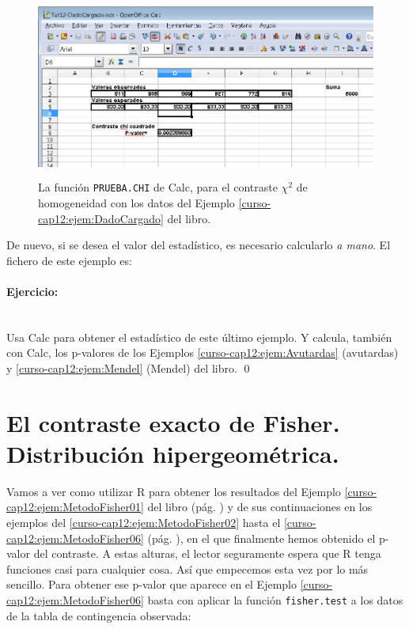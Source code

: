\documentclass[10pt,a4paper]{article}\usepackage[]{graphicx}\usepackage[]{color}
\newcounter {cont01}
\begin{document}
\begin{figure}[tb]
\begin{center}
    \includegraphics[height=6cm]{../fig/Tut12-Calc02.png}
\end{center}
\caption{La función {\tt PRUEBA.CHI} de Calc, para el contraste $\chi^2$ de homogeneidad con los datos del Ejemplo \ref{curso-cap12:ejem:DadoCargado} del libro.}
\label{tut10:fig:Calc02}
\end{figure}
De nuevo, si se desea el valor del estadístico, es necesario calcularlo {\em a mano}. El fichero de este ejemplo es:
\begin{center}
\end{center}

\paragraph{Ejercicio:}\label{tut12:ejercicio07}\quad\\
Usa Calc para obtener el estadístico de este último ejemplo. Y calcula, también con Calc, los p-valores de los Ejemplos \ref{curso-cap12:ejem:Avutardas} (avutardas) y \ref{curso-cap12:ejem:Mendel} (Mendel) del libro.
\qed



\section{El contraste exacto de Fisher. Distribución hipergeométrica.}

Vamos a ver como utilizar R para obtener los resultados del Ejemplo \ref{curso-cap12:ejem:MetodoFisher01} del libro (pág. \pageref{curso-cap12:ejem:MetodoFisher01}) y de sus continuaciones en los ejemplos del \ref{curso-cap12:ejem:MetodoFisher02} hasta el  \ref{curso-cap12:ejem:MetodoFisher06} (pág. \pageref{curso-cap12:ejem:MetodoFisher06}), en el que finalmente hemos obtenido el p-valor del contraste. A estas alturas, el lector seguramente espera que R tenga funciones casi para cualquier cosa. Así que empecemos esta vez por lo más sencillo. Para obtener ese p-valor que aparece en el Ejemplo \ref{curso-cap12:ejem:MetodoFisher06} basta con aplicar la función {\tt fisher.test} a los datos de la tabla de contingencia observada:
\end{document}

